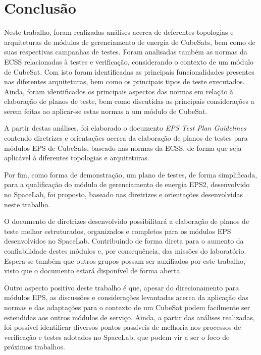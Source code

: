\chapter{Conclusão}

Neste trabalho, foram realizadas análises acerca de deferentes topologias e arquiteturas de módulos de gerenciamento de energia de CubeSats, bem como de suas respectivas campanhas de testes. Foram analisadas também as normas da \gls{ECSS} relacionadas à testes e verificação, considerando o contexto de um módulo de CubeSat. Com isto foram identificadas as principais funcionalidades presentes nas diferentes arquiteturas, bem como os principais tipos de teste executados. Ainda, foram identificados os principais aspectos das normas em relação à elaboração de planos de teste, bem como discutidas as principais considerações a serem feitas ao aplicar-se estas normas a um módulo de CubeSat.

A partir destas análises, foi elaborado o documento \textit{EPS Test Plan Guidelines} contendo diretrizes e orientações acerca da elaboração de planos de testes para módulos \gls{EPS} de CubeSats, baseado nas normas da \gls{ECSS}, de forma que seja aplicável à diferentes topologias e arquiteturas.

Por fim, como forma de demonstração, um plano de testes, de forma simplificada, para a qualificação do módulo de gerenciamento de energia \gls{EPS2}, desenvolvido no SpaceLab, foi proposto, baseado nas diretrizes e orientações desenvolvidas neste trabalho.

O documento de diretrizes desenvolvido possibilitará a elaboração de planos de teste melhor estruturados, organizados e completos para os módulos \gls{EPS} desenvolvidos no SpaceLab.
Contribuindo de forma direta para o aumento da confiabilidade destes módulos e, por consequência, das missões do laboratório.
Espera-se também que outros grupos possam ser auxiliados por este trabalho, visto que o documento estará disponível de forma aberta.

Outro aspecto positivo deste trabalho é que, apesar do direcionamento para módulos \gls{EPS}, as discussões e considerações levantadas acerca da aplicação das normas e das adaptações para o contexto de um CubeSat podem facilmente ser estendidas aos outros módulos de serviço.
Ainda, a partir das análises realizadas, foi possível identificar diversos pontos passíveis de melhoria nos processos de verificação e testes adotados no SpaceLab, que podem vir a ser o foco de próximos trabalhos.

